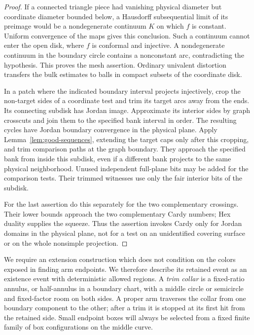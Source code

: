 \begin{proof}
If a connected triangle piece had vanishing physical diameter but
coordinate diameter bounded below, a Hausdorff subsequential
limit of its preimage would be a nondegenerate continuum $K$
on which $f$ is constant.  Uniform convergence of the maps gives
this conclusion.  Such a continuum cannot enter the open disk,
where $f$ is conformal and injective.  A nondegenerate continuum
in the boundary circle contains a nonconstant arc, contradicting
the hypothesis.  This proves the mesh assertion.  Ordinary
univalent distortion transfers the bulk estimates to balls in
compact subsets of the coordinate disk.

In a patch where the indicated boundary interval projects
injectively, crop the non-target sides of a coordinate test and
trim its target arcs away from the ends.  Its connecting subdisk
has Jordan image.  Approximate its interior sides by graph
crosscuts and join them to the specified bank interval in order.
The resulting cycles have Jordan boundary convergence in the
physical plane.  Apply Lemma~\ref{lem:good-sequences}, extending
the target caps only after this cropping, and trim comparison
paths at the graph boundary.  They approach the specified bank
from inside this subdisk, even if a different bank projects to
the same physical neighborhood.  Unused independent full-plane
bits may be added for the comparison tests.  Their trimmed
witnesses use only the fair interior bits of the subdisk.

For the last assertion do this separately for the two
complementary crossings.  Their lower bounds approach the two
complementary Cardy numbers; Hex duality supplies the squeeze.
Thus the assertion invokes Cardy only for Jordan domains in the
physical plane, not for a test on an unidentified covering
surface or on the whole nonsimple projection.
\end{proof}

We require an extension construction which does not condition on
the colors exposed in finding arm endpoints.  We therefore
describe its retained event as an existence event with deterministic
allowed regions.  A \emph{trim collar} is a fixed-ratio annulus,
or half-annulus in a boundary chart, with a middle circle or
semicircle and fixed-factor room on both sides.  A proper arm
traverses the collar from one boundary component to the other;
after a trim it is stopped at its first hit from the retained
side.  Small endpoint boxes will always be selected from a fixed
finite family of box configurations on the middle curve.

